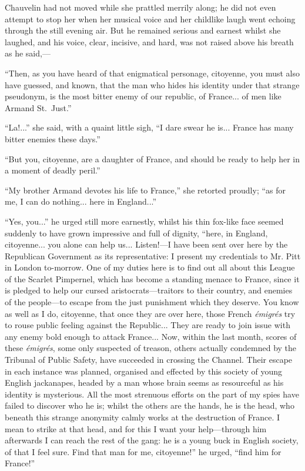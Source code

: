 \documentclass[paper=5.5in:8.5in,BCOR=7mm,twoside,DIV=calc,12pt,usegeometry,chapterprefix,endperiod,headings=big]{scrbook}
\begin{document}
Chauvelin had not moved while she prattled merrily along; he did not even attempt to stop her when her musical voice and her childlike laugh went echoing through the still evening air. But he remained serious and earnest whilst she laughed, and his voice, clear, incisive, and hard, was not raised above his breath as he said,---

\enquote{Then, as you have heard of that enigmatical personage, citoyenne, you must also have guessed, and known, that the man who hides his identity under that strange pseudonym, is the most bitter enemy of our republic, of France... of men like Armand St.~Just.}

\enquote{La!...} she said, with a quaint little sigh, \enquote{I dare swear he is... France has many bitter enemies these days.}

\enquote{But you, citoyenne, are a daughter of France, and should be ready to help her in a moment of deadly peril.}

\enquote{My brother Armand devotes his life to France,} she retorted proudly; \enquote{as for me, I can do nothing... here in England...}

\enquote{Yes, you...} he urged still more earnestly, whilst his thin fox-like face seemed suddenly to have grown impressive and full of dignity, \enquote{here, in England, citoyenne... you alone can help us... Listen!---I have been sent over here by the Republican Government as its representative: I present my credentials to Mr. Pitt in London to-morrow. One of my duties here is to find out all about this League of the Scarlet Pimpernel, which has become a standing menace to France, since it is pledged to help our cursed aristocrats---traitors to their country, and enemies of the people---to escape from the just punishment which they deserve. You know as well as I do, citoyenne, that once they are over here, those French \textit{émigrés} try to rouse public feeling against the Republic... They are ready to join issue with any enemy bold enough to attack France... Now, within the last month, scores of these \textit{émigrés}, some only suspected of treason, others actually condemned by the Tribunal of Public Safety, have succeeded in crossing the Channel. Their escape in each instance was planned, organised and effected by this society of young English jackanapes, headed by a man whose brain seems as resourceful as his identity is mysterious. All the most strenuous efforts on the part of my spies have failed to discover who he is; whilst the others are the hands, he is the head, who beneath this strange anonymity calmly works at the destruction of France. I mean to strike at that head, and for this I want your help---through him afterwards I can reach the rest of the gang: he is a young buck in English society, of that I feel sure. Find that man for me, citoyenne!} he urged, \enquote{find him for France!}
\end{document}

